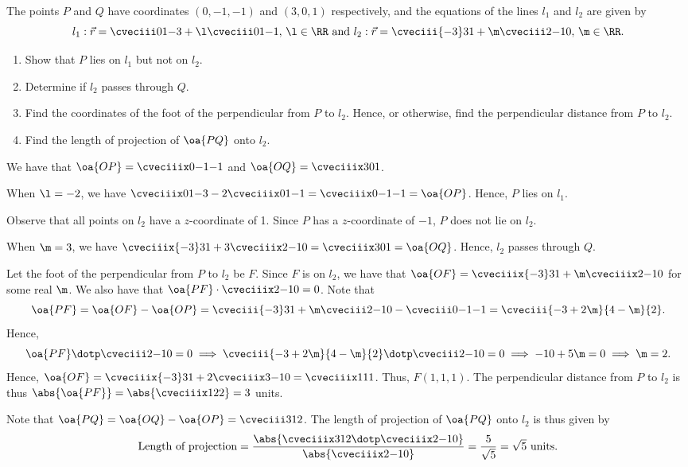 \clearpage
\begin{problem}
    The points $P$ and $Q$ have coordinates $(0, -1, -1)$ and $(3, 0, 1)$ respectively, and the equations of the lines $l_1$ and $l_2$ are given by \[l_1 : \vec r = \cveciii01{-3} + \l\cveciii01{-1}, \, \l \in \RR \text{ and } l_2 : \vec r = \cveciii{-3}31 + \m \cveciii2{-1}0, \, \m \in \RR.\]

    \begin{enumerate}
        \item Show that $P$ lies on $l_1$ but not on $l_2$.
        \item Determine if $l_2$ passes through $Q$.
        \item Find the coordinates of the foot of the perpendicular from $P$ to $l_2$. Hence, or otherwise, find the perpendicular distance from $P$ to $l_2$.
        \item Find the length of projection of $\oa{PQ}$ onto $l_2$.
    \end{enumerate}
\end{problem}
\begin{solution}
    We have that $\oa{OP} = \cveciiix0{-1}{-1}$ and $\oa{OQ} = \cveciiix301$.

    \begin{ppart}
        When $\l = -2$, we have $\cveciiix01{-3} - 2\cveciiix01{-1} = \cveciiix0{-1}{-1} = \oa{OP}$. Hence, $P$ lies on $l_1$.

        Observe that all points on $l_2$ have a $z$-coordinate of 1. Since $P$ has a $z$-coordinate of $-1$, $P$ does not lie on $l_2$.
    \end{ppart}
    \begin{ppart}
        When $\m = 3$, we have $\cveciiix{-3}31 + 3\cveciiix2{-1}0 = \cveciiix301 = \oa{OQ}$. Hence, $l_2$ passes through $Q$.
    \end{ppart}
    \begin{ppart}
        Let the foot of the perpendicular from $P$ to $l_2$ be $F$. Since $F$ is on $l_2$, we have that $\oa{OF} = \cveciiix{-3}31 + \m\cveciiix2{-1}0$ for some real $\m$. We also have that $\oa{PF} \cdot \cveciiix2{-1}0 = 0$. Note that \[\oa{PF} = \oa{OF} - \oa{OP} = \cveciii{-3}31 + \m\cveciii2{-1}0 - \cveciii0{-1}{-1} = \cveciii{-3 + 2\m}{4-\m}{2}.\] Hence, \[\oa{PF} \dotp \cveciii2{-1}0 = 0 \implies \cveciii{-3 + 2\m}{4-\m}{2} \dotp \cveciii2{-1}0 = 0 \implies -10 + 5\m = 0 \implies \m = 2.\] Hence, $\oa{OF} = \cveciiix{-3}31 + 2\cveciiix3{-1}0 = \cveciiix111$. Thus, $F(1, 1, 1)$. The perpendicular distance from $P$ to $l_2$ is thus $\abs{\oa{PF}} = \abs{\cveciiix122} = 3$ units.
    \end{ppart}
    \begin{ppart}
        Note that $\oa{PQ} = \oa{OQ} - \oa{OP} = \cveciii312$. The length of projection of $\oa{PQ}$ onto $l_2$ is thus given by \[\text{Length of projection} = \frac{\abs{\cveciiix312 \dotp \cveciiix2{-1}0}}{\abs{\cveciiix2{-1}0}} = \frac5{\sqrt 5} = \sqrt{5} \text{ units}.\]
    \end{ppart}
\end{solution}

